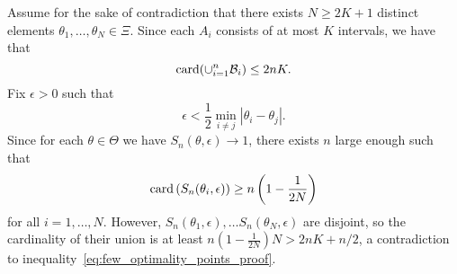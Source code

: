 Assume for the sake of contradiction that there exists $N \geq 2K + 1$
distinct elements $\theta_1,\ldots,\theta_N \in \Xi$. Since each $A_i$
consists of at most $K$ intervals, we have that
\begin{equation}
  \label{eq:few_optimality_points_proof}
  \mathrm{card} (\cup_{i=1}^n \mathcal B_i) \leq 2 n K. 
\end{equation}
Fix $\epsilon>0$ such that 
\begin{equation*}
  \epsilon < \frac{1}{2}\min_{i\neq j} |\theta_i - \theta_j|. 
\end{equation*}
Since for each $\theta \in \Theta$ we have $S_n(\theta, \epsilon) \to 1$, there exists $n$ large enough such that 
\begin{equation*}
  \mathrm{card} \left(S_n(\theta_i, \epsilon) \right)
  \geq n \left(1-\frac{1}{2N} \right)
\end{equation*}
for all $i=1,\ldots,N$. However, $S_n(\theta_1,\epsilon), \ldots
S_n(\theta_N,\epsilon)$ are disjoint, so the cardinality of their union is
at least $n\left(1-\frac{1}{2N} \right)N > 2nK + n/2$, a contradiction to
inequality~\eqref{eq:few_optimality_points_proof}.

